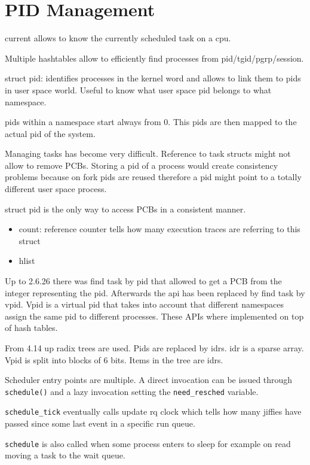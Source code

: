 \documentclass[twoside]{article}
\begin{document}
\section{PID Management}
\label{sec:PID Management}


current allows to know the currently scheduled task on a cpu.

Multiple hashtables allow to efficiently find processes from
pid/tgid/pgrp/session.


struct pid: identifies processes in the kernel word and allows to link them to
pids in user space world. Useful to know what user space pid belongs to what
namespace.

pids within a namespace start always from 0. This pids are then mapped to the
actual pid of the system.

Managing tasks has become very difficult. Reference to task structs might not
allow to remove PCBs. Storing a pid of a process would create consistency
problems because on fork pids are reused therefore a pid might point to a
totally different user space process.

struct pid is the only way to access PCBs in a consistent manner.

\begin{itemize}
    \item count: reference counter tells how many execution traces are referring
        to this struct
    \item hlist
\end{itemize}


Up to 2.6.26 there was find task by pid that allowed to get a PCB from the
integer representing the pid. Afterwards the api has been replaced by find task
by vpid. Vpid is a virtual pid that takes into account that different namespaces
assign the same pid to different processes. These APIs where implemented on top
of hash tables.

From 4.14 up radix trees are used. Pids are replaced by idrs. idr is a sparse
array. Vpid is split into blocks of 6 bits. Items in the tree are idrs.



Scheduler entry points are multiple. A direct invocation can be issued through
\texttt{schedule()} and a lazy invocation setting the \texttt{need_resched}
variable.

\texttt{schedule_tick} eventually calls update rq clock which tells how many
jiffies have passed since some last event in a specific run queue.

\texttt{schedule} is also called when some process enters to sleep for example
on read moving a task to the wait queue.
\end{document}
